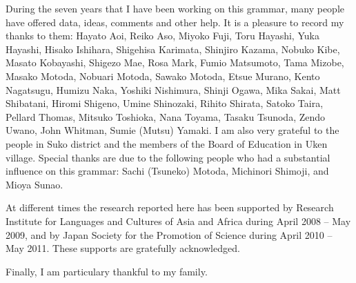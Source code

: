 \addchap{\lsAcknowledgementTitle} 
During the seven years that I have been working on this grammar, many people have offered data, ideas, comments and other help. It is a pleasure to record my thanks to them: Hayato Aoi, Reiko Aso, Miyoko Fuji, Toru Hayashi, Yuka Hayashi, Hisako Ishihara, Shigehisa Karimata, Shinjiro Kazama, Nobuko Kibe, Masato Kobayashi, Shigezo Mae, Rosa Mark, Fumio Matsumoto, Tama Mizobe, Masako Motoda, Nobuari Motoda, Sawako Motoda, Etsue Murano, Kento Nagatsugu, Humizu Naka, Yoshiki Nishimura, Shinji Ogawa, Mika Sakai, Matt Shibatani, Hiromi Shigeno, Umine Shinozaki, Rihito Shirata, Satoko Taira, Pellard Thomas, Mitsuko Toshioka, Nana Toyama, Tasaku Tsunoda, Zendo Uwano, John Whitman, Sumie (Mutsu) Yamaki. I am also very grateful to the people in Suko district and the members of the Board of Education in Uken village. Special thanks are due to the following people who had a substantial influence on this grammar: Sachi (Tsuneko) Motoda, Michinori Shimoji, and Mioya Sunao.

At different times the research reported here has been supported by Research Institute for Languages and Cultures of Asia and Africa during April 2008 -- May 2009, and by Japan Society for the Promotion of Science during April 2010 -- May 2011. These supports are gratefully acknowledged.

Finally, I am particulary thankful to my family.
